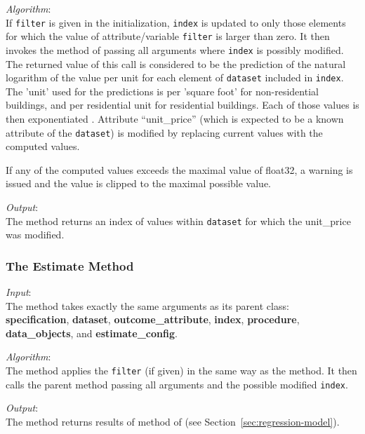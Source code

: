 {\it Algorithm}:\\[1mm]
If \verb|filter| is given in the initialization, \verb|index| is
updated to only those elements for which the value of
attribute/variable \verb|filter| is
larger than zero. It then invokes the  method of
 passing all arguments where
\verb|index| is possibly modified. The returned value of this call
is considered to be the prediction of the natural logarithm of the value 
per unit for each element of \verb|dataset| included in
\verb|index|. The 'unit' used for the predictions is per 'square foot' 
for non-residential buildings, and per residential unit for residential buildings. 
Each of those values is then exponentiated . 
Attribute ``unit_price'' 
 (which is expected to be a known
attribute of the \verb|dataset|) is modified by
replacing current values with the computed values.

If any of the computed values exceeds the maximal value of float32, a warning
is issued and the value is clipped to the maximal possible value.

{\it Output}:\\[1mm]
The method returns an index of values within \verb|dataset| for which the 
unit_price was modified.

\subsubsection{The Estimate Method}
{\it Input}:\\[1mm]
The  method takes exactly the same arguments as its parent
class: \\
{\bf specification}, {\bf dataset}, {\bf outcome_attribute}, {\bf index}, {\bf
  procedure}, {\bf data_objects}, and {\bf estimate_config}.

{\it Algorithm}:\\[1mm]
The method applies the \verb|filter| (if given) in the same way as the
 method. It then calls the parent method 
passing all arguments and the possible modified \verb|index|.

{\it Output}:\\[1mm]
The method returns results of  method of
 (see Section~\ref{sec:regression-model}).

